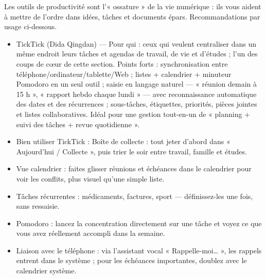 


Les outils de productivité sont l'« ossature » de la vie numérique : ils vous aident à mettre de l'ordre dans idées, tâches et documents épars. Recommandations par usage ci-dessous.


\begin{itemize}
  \item TickTick (Dida Qingdan) — Pour qui : ceux qui veulent centraliser dans un même endroit leurs tâches et agendas de travail, de vie et d'études ; l'un des coups de cœur de cette section. Points forts : synchronisation entre téléphone/ordinateur/tablette/Web ; listes + calendrier + minuteur Pomodoro en un seul outil ; saisie en langage naturel — « réunion demain à 15 h », « rapport hebdo chaque lundi » — avec reconnaissance automatique des dates et des récurrences ; sous-tâches, étiquettes, priorités, pièces jointes et listes collaboratives. Idéal pour une gestion tout-en-un de « planning + suivi des tâches + revue quotidienne ».
  \item Bien utiliser TickTick : Boîte de collecte : tout jeter d'abord dans « Aujourd'hui / Collecte », puis trier le soir entre travail, famille et études.
  \item Vue calendrier : faites glisser réunions et échéances dans le calendrier pour voir les conflits, plus visuel qu'une simple liste.
  \item Tâches récurrentes : médicaments, factures, sport — définissez-les une fois, sans ressaisie.
  \item Pomodoro : lancez la concentration directement sur une tâche et voyez ce que vous avez réellement accompli dans la semaine.
  \item Liaison avec le téléphone : via l'assistant vocal « Rappelle-moi… », les rappels entrent dans le système ; pour les échéances importantes, doublez avec le calendrier système.
\end{itemize}

